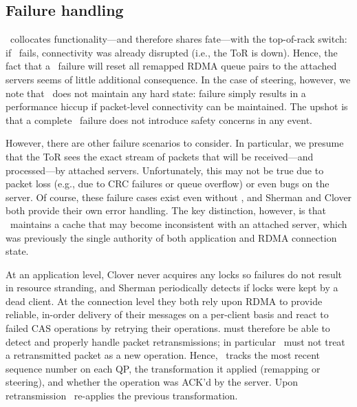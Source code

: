 \subsection{Failure handling}

\sword\ collocates functionality---and therefore shares fate---with the
top-of-rack switch: if \sword\ fails, connectivity was already
disrupted (i.e., the ToR is down).  Hence, the fact that a
\sword\ failure will reset all remapped RDMA queue pairs to the
attached servers seems of little additional consequence.  In the case
of steering, however, we note that \sword\ does not maintain any hard
state: failure simply results in a performance hiccup if packet-level
connectivity can be maintained.  The upshot is that a complete
\sword\ failure does not introduce safety concerns in any event.

However, there are other failure scenarios to consider.  In
particular, we presume that the ToR sees the exact stream of packets
that will be received---and processed---by attached servers.
Unfortunately, this may not be true due to packet loss (e.g., due to
CRC failures or queue overflow) or even bugs on the server.  Of
course, these failure cases exist even without \sword, and Sherman and
Clover both provide their own error handling.  The key distinction,
however, is that \sword\ maintains a cache that may become
inconsistent with an attached server, which was previously the single
authority of both application and RDMA connection state.


At an application level, Clover never acquires any locks so failures
do not result in resource stranding, and Sherman periodically detects
if locks were kept by a dead client.  At the connection level they
both rely upon RDMA to provide reliable, in-order delivery of their
messages on a per-client basis and react to failed CAS operations by
retrying their operations.  {\sword} must therefore be able to detect
and properly handle packet retransmissions; in particular \sword\ must
not treat a retransmitted packet as a new operation.  Hence,
\sword\ tracks the most recent sequence number on each QP, the
transformation it applied (remapping or steering), and whether the
operation was ACK'd by the server.  Upon retransmission
\sword\ re-applies the previous transformation.


